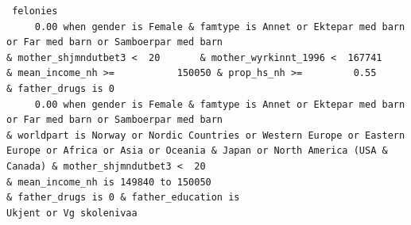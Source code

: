 \documentclass[
  letterpaper,
  DIV=11,
  numbers=noendperiod]{scrreprt}
\begin{document}
\begin{verbatim}
 felonies                                                                                                                                                                                                                                                                                                                                                                                                                                                                                                                                                                                                                                                                                                                                                                                                                                                                              
     0.00 when gender is Female & famtype is Annet or Ektepar med barn or Far med barn or Samboerpar med barn                                                                                                                                                                                                                                 & mother_shjmndutbet3 <  20       & mother_wyrkinnt_1996 <  167741                                                                                       & mean_income_nh >=           150050 & prop_hs_nh >=         0.55                                                                                                                                                                                                 & father_drugs is 0                                                                                           
     0.00 when gender is Female & famtype is Annet or Ektepar med barn or Far med barn or Samboerpar med barn                                                                              & worldpart is Norway or Nordic Countries or Western Europe or Eastern Europe or Africa or Asia or Oceania & Japan or North America (USA & Canada) & mother_shjmndutbet3 <  20                                                                                                                              & mean_income_nh is 149840 to 150050                                                                                                                                                                                                                              & father_drugs is 0 & father_education is                          Ukjent or Vg skolenivaa                    

\end{verbatim}
\end{document}
